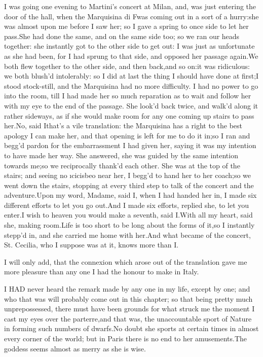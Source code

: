 \documentclass[twoside]{article}
\begin{document}
I was going one evening to Martini’s concert at Milan, and, was just
entering the door of the hall, when the Marquisina di F\tsk  was coming out
in a sort of a hurry:\tsk she was almost upon me before I saw her; so I gave
a spring to once side to let her pass.\tsk She had done the same, and on the
same side too; so we ran our heads together: she instantly got to the
other side to get out: I was just as unfortunate as she had been, for I
had sprung to that side, and opposed her passage again.\tsk We both flew
together to the other side, and then back,\tsk and so on:\tsk it was ridiculous:
we both blush’d intolerably: so I did at last the thing I should have
done at first;\tsk I stood stock-still, and the Marquisina had no more
difficulty.  I had no power to go into the room, till I had made her so
much reparation as to wait and follow her with my eye to the end of the
passage.  She look’d back twice, and walk’d along it rather sideways, as
if she would make room for any one coming up stairs to pass her.\tsk No, said
I\tsk that’s a vile translation: the Marquisina has a right to the best
apology I can make her, and that opening is left for me to do it in;\tsk so I
ran and begg’d pardon for the embarrassment I had given her, saying it
was my intention to have made her way.  She answered, she was guided by
the same intention towards me;\tsk so we reciprocally thank’d each other.
She was at the top of the stairs; and seeing no \i{cicisbeo} near her, I
begg’d to hand her to her coach;\tsk so we went down the stairs, stopping at
every third step to talk of the concert and the adventure.\tsk Upon my word,
Madame, said I, when I had handed her in, I made six different efforts to
let you go out.\tsk And I made six efforts, replied she, to let you enter.\tsk I
wish to heaven you would make a seventh, said I.\tsk With all my heart, said
she, making room.\tsk Life is too short to be long about the forms of it,\tsk so
I instantly stepp’d in, and she carried me home with her.\tsk And what became
of the concert, St. Cecilia, who I suppose was at it, knows more than I.

I will only add, that the connexion which arose out of the translation
gave me more pleasure than any one I had the honour to make in Italy.






I HAD never heard the remark made by any one in my life, except by one;
and who that was will probably come out in this chapter; so that being
pretty much unprepossessed, there must have been grounds for what struck
me the moment I cast my eyes over the parterre,\tsk and that was, the
unaccountable sport of Nature in forming such numbers of dwarfs.\tsk No doubt
she sports at certain times in almost every corner of the world; but in
Paris there is no end to her amusements.\tsk The goddess seems almost as
merry as she is wise.
\end{document}
